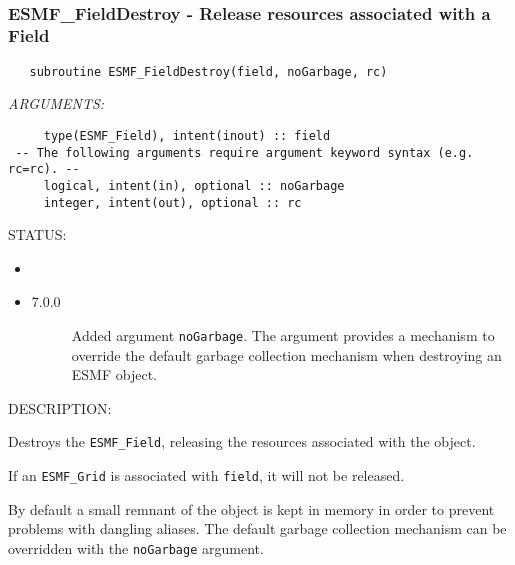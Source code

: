  
\mbox{}\hrulefill\ 
 
\subsubsection [ESMF\_FieldDestroy] {ESMF\_FieldDestroy - Release resources associated with a Field}


\begin{verbatim}   subroutine ESMF_FieldDestroy(field, noGarbage, rc)\end{verbatim}{\em ARGUMENTS:}
\begin{verbatim}     type(ESMF_Field), intent(inout) :: field
 -- The following arguments require argument keyword syntax (e.g. rc=rc). --
     logical, intent(in), optional :: noGarbage
     integer, intent(out), optional :: rc\end{verbatim}
{\sf STATUS:}
   \begin{itemize}
   \item{}
   \item{}
   \begin{description}
   \item[7.0.0] Added argument {\tt noGarbage}.
   The argument provides a mechanism to override the default garbage collection
   mechanism when destroying an ESMF object.
   \end{description}
   \end{itemize}
  
{\sf DESCRIPTION:\\ }


   Destroys the {\tt ESMF\_Field}, releasing the resources associated with
   the object.
  
   If an {\tt ESMF\_Grid} is associated with {\tt field}, it will not be
   released.
  
   By default a small remnant of the object is kept in memory in order to
   prevent problems with dangling aliases. The default garbage collection
   mechanism can be overridden with the {\tt noGarbage} argument.
  
